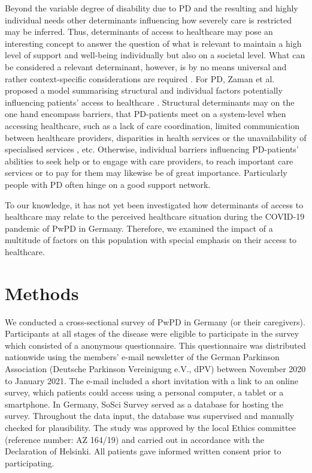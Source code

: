\documentclass[a4paper,oneside,11pt,english]{scrartcl}
\begin{document}
Beyond the variable degree of disability due to \textsc{PD} and the resulting and highly individual needs other determinants influencing how severely care is restricted may be inferred. Thus, determinants of access to healthcare may pose an interesting concept to answer the question of what is relevant to maintain a high level of support and well-being individually but also on a societal level. What can be considered a relevant determinant, however, is by no means universal and rather context-specific considerations are required \cite{world2010conceptual}. For \textsc{PD}, Zaman et al. proposed a model summarising structural and individual factors potentially influencing patients' access to healthcare \cite{zaman2021barriers}. Structural determinants may on the one hand encompass barriers, that \textsc{PD}-patients meet on a system-level when accessing healthcare, such as a lack of care coordination, limited communication between healthcare providers, disparities in health services or the unavailability of specialised services \cite{zaman2021barriers}, etc. Otherwise, individual barriers influencing \textsc{PD}-patients' abilities to seek help or to engage with care providers, to reach important care services or to pay for them \cite{zaman2021barriers} may likewise be of great importance. Particularly people with \textsc{PD} often hinge on a good support network. 

To our knowledge, it has not yet been investigated how determinants of access to healthcare may relate to the perceived healthcare situation during the \textsc{COVID}-19 pandemic of Pw\textsc{PD} in Germany. Therefore, we examined the impact of a multitude of factors on this population with special emphasis on their access to healthcare.

\newpage

\section*{Methods}
We conducted a cross-sectional survey of Pw\textsc{PD} in Germany (or their caregivers). Participants at all stages of the disease were eligible to participate in the survey which consisted of a anonymous questionnaire. This questionnaire was distributed nationwide using the members' e-mail newsletter of the German Parkinson Association (Deutsche Parkinson Vereinigung e.V., dPV) between November 2020 to January 2021. The e-mail included a short invitation with a link to an online survey, which patients could access using a personal computer, a tablet or a smartphone. In Germany, SoSci Survey \cite{leiner2019sosci} served as a database for hosting the survey. Throughout the data input, the database was supervised and manually checked for plausibility. The study was approved by the local Ethics committee (reference number: AZ 164/19) and carried out in accordance with the Declaration of Helsinki. All patients gave informed written consent prior to participating.
\end{document}
